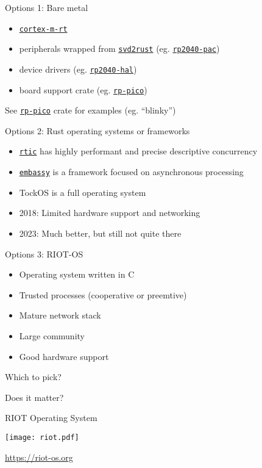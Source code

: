 \documentclass[aspectratio=169]{beamer}
\newcommand{\crate}[1]{\texttt{\href{https://crates.io/crates/#1}{#1}}}
\begin{document}
\begin{frame}{Options 1: Bare metal}
  \begin{itemize}
    \item \crate{cortex-m-rt}
    \item peripherals wrapped from \crate{svd2rust} (eg. \crate{rp2040-pac})
    \item device drivers (eg. \crate{rp2040-hal})
    \item board support crate (eg. \crate{rp-pico})
  \end{itemize}

  See \crate{rp-pico} crate for examples (eg. ``blinky'')
\end{frame}

\begin{frame}{Options 2: Rust operating systems or frameworks}
    \begin{itemize}
      \item \crate{rtic} has highly performant and precise descriptive concurrency
      \item \crate{embassy} is a framework focused on asynchronous processing
      \item TockOS is a full operating system
      \item 2018: Limited hardware support and networking
      \item 2023: Much better, but still not quite there
    \end{itemize}
\end{frame}

\begin{frame}{Options 3: RIOT-OS}
    \begin{itemize}
      \item Operating system written in C
      \item Trusted processes (cooperative or preemtive)
      \item Mature network stack
      \item Large community
      \item Good hardware support
    \end{itemize}
\end{frame}

\begin{frame}
  \center\Huge{Which to pick?}
\end{frame}

\begin{frame}
  \center\Huge{Does it matter?}
\end{frame}
\begin{frame}{}
    \huge \center RIOT Operating System

    \center \texttt{[image: riot.pdf]}

    \Large \center \url{https://riot-os.org}
\end{frame}
\end{document}
